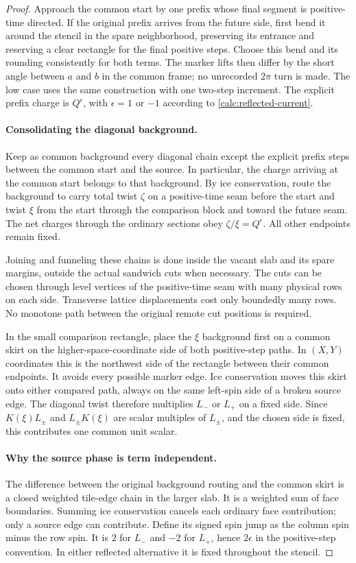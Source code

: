 \begin{proof}
Approach the common start by one prefix whose final segment is
positive-time directed.  If the original prefix arrives from the
future side, first bend it around the stencil in the spare
neighborhood, preserving its entrance and reserving a clear
rectangle for the final positive steps.  Choose this bend and its
rounding consistently for both terms.  The marker lifts then differ
by the short angle between $a$ and $b$ in the common frame; no
unrecorded $2\pi$ turn is made.  The low case uses the same construction
with one two-step increment.  The explicit prefix charge is
$Q^\epsilon$, with $\epsilon=1$ or $-1$ according to
\eqref{calc:reflected-current}.

\paragraph{Consolidating the diagonal background.}
Keep as common background every diagonal chain except the explicit
prefix steps between the common start and the source.  In particular,
the charge arriving at the common start belongs to that background.
By ice conservation, route the background to carry total twist
$\zeta$ on a positive-time seam before the start and twist $\xi$
from the start through the comparison block and toward the future
seam.  The net charges through the ordinary sections obey
$\zeta/\xi=Q^\epsilon$.  All other endpoints remain fixed.

Joining and funneling these chains is done inside the vacant slab
and its spare margins, outside the actual sandwich cuts when
necessary.  The cuts can be chosen through level vertices of the
positive-time seam with many physical rows on each side.  Transverse
lattice displacements cost only boundedly many rows.  No monotone
path between the original remote cut positions is required.

In the small comparison rectangle, place the $\xi$ background first
on a common skirt on the higher-space-coordinate side of both
positive-step paths.  In $(X,Y)$ coordinates this is the northwest
side of the rectangle between their common endpoints.  It avoids
every possible marker edge.  Ice conservation moves this skirt
onto either compared path, always on the same left-spin side of a
broken source edge.  The diagonal twist therefore multiplies
$L_-$ or $L_+$ on a fixed side.  Since
$K(\xi)L_\pm$ and $L_\pm K(\xi)$ are scalar multiples of $L_\pm$,
and the chosen side is fixed, this contributes one common unit
scalar.

\paragraph{Why the source phase is term independent.}
The difference between the original background routing and the
common skirt is a closed weighted tile-edge chain in the larger
slab.  It is a weighted sum of face boundaries.  Summing ice
conservation cancels each ordinary face contribution; only a source
edge can contribute.  Define its signed spin jump as the column spin
minus the row spin.  It is $2$ for $L_-$ and $-2$ for $L_+$, hence
$2\epsilon$ in the positive-step convention.  In either reflected
alternative it is fixed throughout the stencil.


\end{proof}
